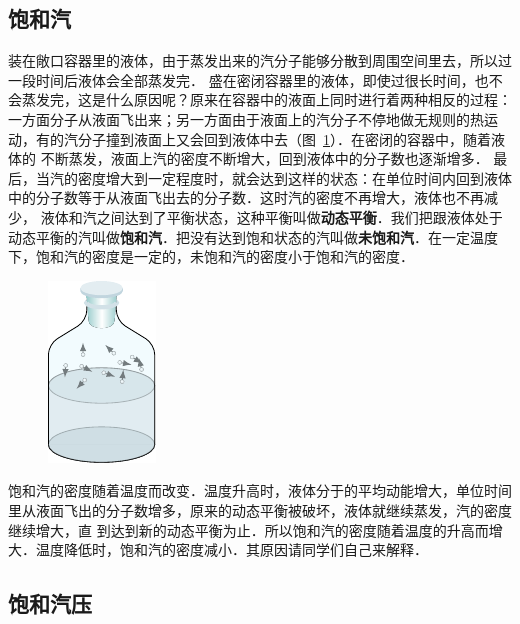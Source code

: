 \subsection{饱和汽} 
装在敞口容器里的液体，由于蒸发出来的汽分子能够分散到周围空间里去，所以过一段时间后液体会全部蒸发完．
盛在密闭容器里的液体，即使过很长时间，也不会蒸发完，这是什么原因呢？原来在容器中的液面上同时进行着两种相反的过程：一方面分子从液面飞出来；另一方面由于液面上的汽分子不停地做无规则的热运动，有的汽分子撞到液面上又会回到液体中去（图~\ref{fig_B_5-2}）．在密闭的容器中，随着液体的
不断蒸发，液面上汽的密度不断增大，回到液体中的分子数也逐渐增多．
最后，当汽的密度增大到一定程度时，就会达到这样的状态：在单位时间内回到液体中的分子数等于从液面飞出去的分子数．这时汽的密度不再增大，液体也不再减少，
液体和汽之间达到了平衡状态，这种平衡叫做\textbf{动态平衡}．我们把跟液体处于动态平衡的汽叫做\textbf{饱和汽}．把没有达到饱和状态的汽叫做\textbf{未饱和汽}．在一定温度下，饱和汽的密度是一定的，未饱和汽的密度小于饱和汽的密度．

\begin{figure}[htbp]
  \centering
  \includegraphics{fig/B/5-2.pdf}
  \caption{}\label{fig_B_5-2}
\end{figure}

饱和汽的密度随着温度而改变．温度升高时，液体分于的平均动能增大，单位时间里从液面飞出的分子数增多，原来的动态平衡被破坏，液体就继续蒸发，汽的密度继续增大，直
到达到新的动态平衡为止．所以饱和汽的密度随着温度的升高而增大．温度降低时，饱和汽的密度减小．其原因请同学们自己来解释．

\subsection{饱和汽压} 


